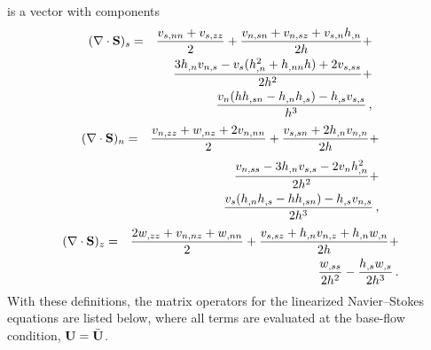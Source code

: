 is a vector with components
%
\begin{eqnarray}
(\nabla \cdot {\bf S})_s &=& \frac{v_{s,nn}+v_{s,zz}}{2} +
                         \frac{v_{n,sn}+v_{n,sz}+v_{s,n}h_{,n}}{2h} + \nonumber \\
		     & & \frac{3h_{,n}v_{n,s}-{v_s}(h_{,n}^2 + h_{,nn} h)+2v_{s,ss}}{2 h^2} +
			 \nonumber \\
                     & & \frac{{v_n}(hh_{,sn} - h_{,n}h_{,s}) - h_{,s}v_{s,s}}{h^3} {\, ,}
\end{eqnarray}
%
\begin{eqnarray}
(\nabla \cdot {\bf S})_n &=& \frac{v_{n,zz} + w_{,nz} + 2v_{n,nn}}{2} + 
			 \frac{v_{s,sn} + 2h_{,n}v_{n,n}}{2h} + \nonumber\\[0.05in]
		     & & \frac{v_{n,ss} - 3h_{,n}v_{s,s} - 2{v_n}h_{,n}^2}{2h^2} +
			 \nonumber \\ 
                     & & \frac{{v_s}(h_{,n}h_{,s} - hh_{,sn}) - h_{,s}v_{n,s}}{2h^3} {\, ,}
\end{eqnarray}
%
\begin{eqnarray}
(\nabla \cdot {\bf S})_z &=& \frac{2w_{,zz} + v_{n,nz} + w_{,nn}}{2} +
 			 \frac{v_{s,sz}+h_{,n}v_{n,z}+h_{,n}w_{,n}}{2h} + \nonumber \\
		     & & \frac{w_{,ss}}{2h^2} - 
		         \frac{h_{,s}w_{,s}}{2h^3} {\, .}
\end{eqnarray}
%
With these definitions, the matrix operators for the linearized Navier--Stokes
equations are listed below, where all terms are evaluated at the base-flow
condition, ${\bf U} = \bar{{\bf U}}$.  

